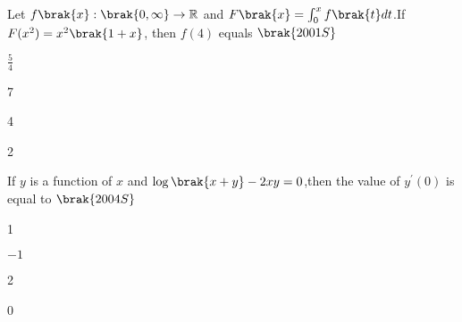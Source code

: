 \item Let $f\brak{x}:\brak{0,\infty}\rightarrow \mathbb{R}$ and $F\brak{x}=\int_{0}^x f\brak{t}dt$.If $F(x^2)=x^2\brak{1+x}$, then $f(4)$ equals $\hfill\brak{2001S}$
\begin{enumerate}
\begin{multicols}{4}
    \item $\frac{5}{4}$
    \item 7
    \item 4
    \item 2
    \end{multicols}
\end{enumerate}
\item If $y$ is a function of $x$ and $\log{\brak{x+y}}-2xy=0$,then the value of $y^{\prime}(0)$ is equal to $\hfill\brak{2004S}$
\begin{enumerate}
\begin{multicols}{4}
    \item 1
    \item $-1$
    \item 2
    \item 0
\end{multicols}

\end{enumerate}


